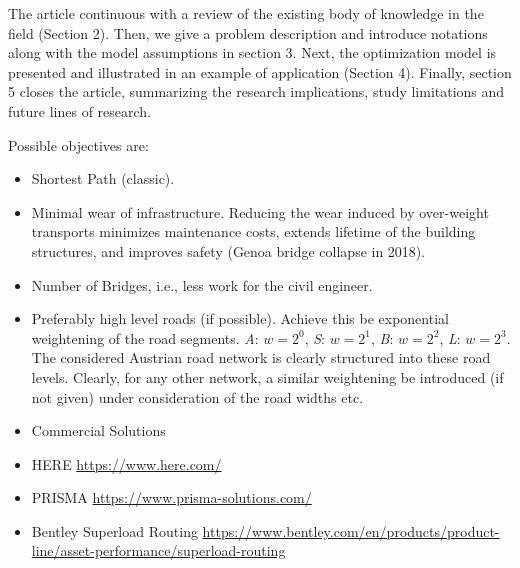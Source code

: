 \par The article continuous with a review of the existing body of knowledge in the field (Section 2). Then, we give a problem description and introduce notations along with the model assumptions in section 3. Next, the optimization model is presented and illustrated in an example of application (Section 4). Finally, section 5 closes the article, summarizing the research implications, study limitations and future lines of research.


Possible objectives are:
\begin{itemize}
  \item Shortest Path (classic).

  \item Minimal wear of infrastructure. Reducing the wear induced by over-weight transports
  minimizes maintenance costs, extends lifetime of the building structures, and
  improves safety (Genoa bridge collapse in 2018).
  \citet{Kakan2014}


  \item Number of Bridges, i.e., less work for the civil engineer.
  \item Preferably high level roads (if possible).
  Achieve this be exponential weightening of the road segments.
  \textit{A}: $w=2^0$,    \textit{S}: $w=2^1$,      \textit{B}: $w=2^2$,     \textit{L}: $w=2^3$.
  The considered Austrian road network is clearly structured into these road levels.
  Clearly, for any other network, a similar weightening be introduced
  (if not given) under consideration of the road widths etc.
\end{itemize}

\begin{itemize}





\item Commercial Solutions

\item HERE
\url{https://www.here.com/}
\item PRISMA
\url{https://www.prisma-solutions.com/}

\item Bentley Superload Routing
\url{https://www.bentley.com/en/products/product-line/asset-performance/superload-routing}

\end{itemize}
